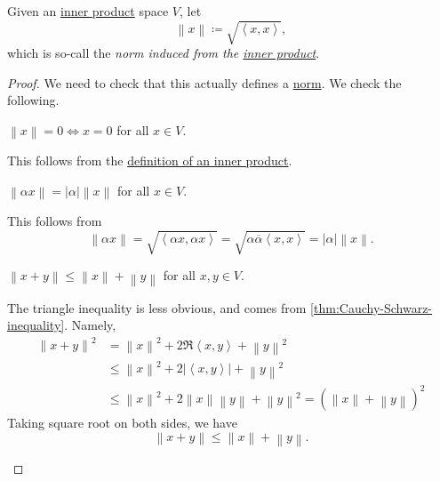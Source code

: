 \begin{definition}\label{def:induced-norm-from-inner-product}
	Given an \hyperref[def:inner-product]{inner product} space \(V\), let
	\[
		\left\lVert x\right\rVert \coloneqq \sqrt{\left< x,x \right>},
	\]
	which is so-call the \emph{norm induced from the \hyperref[def:inner-product]{inner product}}.
\end{definition}
\begin{proof}
	We need to check that this actually defines a \hyperref[def:norm]{norm}. We check the following.
	\begin{claim}
		\(\left\lVert x\right\rVert = 0 \iff x = 0\) for all \(x\in V\).
	\end{claim}
	\begin{explanation}
		This follows from the \hyperref[def:inner-product]{definition of an inner product}.
	\end{explanation}

	\begin{claim}
		\(\left\lVert \alpha x\right\rVert = \left\vert \alpha \right\vert \left\lVert x\right\rVert \) for all \(x\in V\).
	\end{claim}
	\begin{explanation}
		This follows from
		\[
			\left\lVert \alpha x\right\rVert = \sqrt{\left< \alpha x, \alpha x \right> } = \sqrt{\alpha \overline{\alpha}\left< x,x \right> }  = \left\vert \alpha \right\vert \left\lVert x\right\rVert.
		\]
	\end{explanation}

	\begin{claim}
		\(\left\lVert x+y\right\rVert \leq \left\lVert x\right\rVert + \left\lVert y\right\rVert \) for all \(x, y\in V\).
	\end{claim}
	\begin{explanation}
		The triangle inequality is less obvious, and comes from \autoref{thm:Cauchy-Schwarz-inequality}. Namely,
		\[
			\begin{split}
				\left\lVert x + y\right\rVert^2
				 & = \left\lVert x\right\rVert^2 + 2\Re\left< x,y \right> + \left\lVert y\right\rVert^2                                  \\
				 & \leq \left\lVert x\right\rVert^2 + 2\left\vert \left< x,y \right> \right\vert + \left\lVert y\right\rVert^2           \\
				 & \leq \left\lVert x\right\rVert^2 + 2\left\lVert x\right\rVert \left\lVert y\right\rVert + \left\lVert y\right\rVert^2
				= (\left\lVert x\right\rVert + \left\lVert y\right\rVert)^2
			\end{split}
		\]
		Taking square root on both sides, we have
		\[
			\left\lVert x + y\right\rVert \leq \left\lVert x\right\rVert + \left\lVert y\right\rVert.
		\]
	\end{explanation}
\end{proof}


